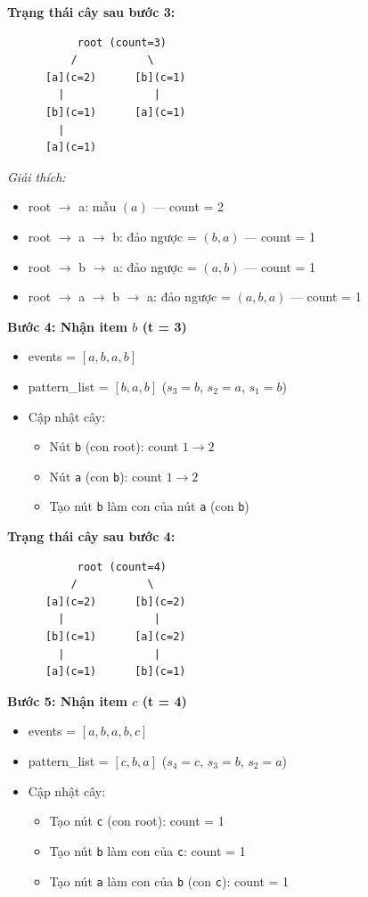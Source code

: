 \documentclass[14pt,a4paper,oneside]{extreport}
\begin{document}
\textbf{Trạng thái cây sau bước 3:}
\begin{verbatim}
           root (count=3)
          /           \
      [a](c=2)      [b](c=1)
        |              |
      [b](c=1)      [a](c=1)
        |
      [a](c=1)
\end{verbatim}

\textit{Giải thích:}
\begin{itemize}
    \item root $\rightarrow$ a: mẫu $(a)$ --- count = 2
    \item root $\rightarrow$ a $\rightarrow$ b: đảo ngược = $(b, a)$ --- count = 1
    \item root $\rightarrow$ b $\rightarrow$ a: đảo ngược = $(a, b)$ --- count = 1
    \item root $\rightarrow$ a $\rightarrow$ b $\rightarrow$ a: đảo ngược = $(a, b, a)$ --- count = 1
\end{itemize}

\vspace{1em}
\noindent\textbf{Bước 4: Nhận item $b$ (t = 3)}

\begin{itemize}
    \item events = $[a, b, a, b]$
    \item pattern\_list = $[b, a, b]$ ($s_3=b$, $s_2=a$, $s_1=b$)
    \item Cập nhật cây:
    \begin{itemize}
        \item Nút \texttt{b} (con root): count $1 \rightarrow 2$
        \item Nút \texttt{a} (con \texttt{b}): count $1 \rightarrow 2$
        \item Tạo nút \texttt{b} làm con của nút \texttt{a} (con \texttt{b})
    \end{itemize}
\end{itemize}

\textbf{Trạng thái cây sau bước 4:}
\begin{verbatim}
           root (count=4)
          /           \
      [a](c=2)      [b](c=2)
        |              |
      [b](c=1)      [a](c=2)
        |              |
      [a](c=1)      [b](c=1)
\end{verbatim}

\vspace{1em}
\noindent\textbf{Bước 5: Nhận item $c$ (t = 4)}

\begin{itemize}
    \item events = $[a, b, a, b, c]$
    \item pattern\_list = $[c, b, a]$ ($s_4=c$, $s_3=b$, $s_2=a$)
    \item Cập nhật cây:
    \begin{itemize}
        \item Tạo nút \texttt{c} (con root): count = 1
        \item Tạo nút \texttt{b} làm con của \texttt{c}: count = 1
        \item Tạo nút \texttt{a} làm con của \texttt{b} (con \texttt{c}): count = 1
    \end{itemize}
\end{itemize}
\end{document}

